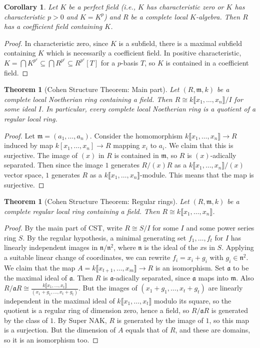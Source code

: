 \documentclass{amsart}[12pt]
\newcommand{\fm}{{\mathfrak m}}
\newcommand{\fa}{{\mathfrak a}}
\newcommand{\fn}{{\mathfrak n}}
\numberwithin{equation}{section}
\theoremstyle{plain} %
\newtheorem{thm}[equation]{Theorem}
\newtheorem{cor}[equation]{Corollary}
\theoremstyle{definition}
\theoremstyle{remark}
\begin{document}
\begin{cor} Let $K$ be a perfect field (i.e., $K$ has characteristic zero or $K$ has characteristic $p>0$ and $K=K^p$) and $R$ be a complete local $K$-algebra. Then $R$ has a coefficient field containing $K$.
\end{cor}
\begin{proof} In characteristic zero, since $K$ is a subfield, there is a maximal subfield containing $K$ which is necessarily a coefficient field. In positive characteristic, $K = \bigcap K^{p^e} \subseteq \bigcap R^{p^e} \subseteq R^{p^e}[T]$ for a $p$-basis $T$, so $K$ is contained in a coefficient field.
\end{proof}

\begin{thm}[Cohen Structure Theorem: Main part] Let $(R,\fm,k)$ be a complete local Noetherian ring containing a field. Then $R\cong k\llbracket x_1,\dots,x_n\rrbracket / I$ for some ideal $I$. In particular, every complete local Noetherian ring is a quotient of a regular local ring.
\end{thm}
\begin{proof}
Let $\fm=(a_1,\dots,a_n)$. Consider the homomorphism $k\llbracket x_1,\dots,x_n\rrbracket \to R$ induced by map $k[x_1,\dots,x_n] \to R$ mapping $x_i$ to $a_i$. We claim that this is surjective. The image of $(x)$ in $R$ is contained in $\fm$, so $R$ is $(x)$-adically separated. Then since the image $1$ generates $R/(x)R$ as a $k\llbracket x_1,\dots,x_n\rrbracket/(x)$ vector space, $1$ generates $R$ as a $k\llbracket x_1,\dots,x_n\rrbracket$-module. This means that the map is surjective.
\end{proof}


\begin{thm}[Cohen Structure Theorem: Regular rings] Let $(R,\fm,k)$ be a complete regular local ring containing a field. Then $R\cong k\llbracket x_1,\dots,x_n\rrbracket$.
\end{thm}
\begin{proof} By the main part of CST, write $R\cong S/I$ for some $I$ and some power series ring $S$. By the regular hypothesis, a minimal generating set $f_1,\dots,f_t$ for $I$ has linearly independent images in $\fn/\fn^2$, where $\fn$ is the ideal of the $x$s in $S$. Applying a suitable linear change of coordinates, we can rewrite $f_i=x_i + g_i$ with $g_i\in \fn^2$. We claim that the map $A=k\llbracket x_{t+1},\dots,x_m\rrbracket \to R$ is an isomorphism. Set $\fa$ to be the maximal ideal of $\fa$. Then $R$ is $\fa$-adically separated, since $\fa$ maps into $\fm$. Also $R/\fa R\cong \frac{k\llbracket x_1,\dots,x_t\rrbracket}{(x_1+g_1,\dots,x_t+g_t)}$. But the images of $(x_1+g_1,\dots,x_t+g_t)$ are linearly independent in the maximal ideal of $k\llbracket x_1,\dots,x_t\rrbracket$ modulo its square, so the quotient is a regular ring of dimension zero, hence a field, so $R/\fa R$ is generated by the class of $1$. By Super NAK, $R$ is generated by the image of $1$, so this map is a surjection. But the dimension of $A$ equals that of $R$, and these are domains, so it is an isomorphism too.
\end{proof}
\end{document}
